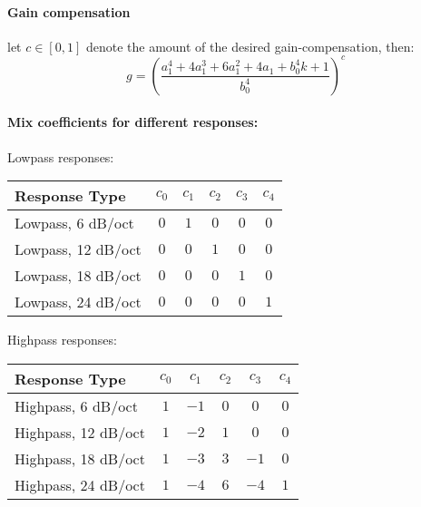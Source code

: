 \paragraph{Gain compensation} let $c \in [0, 1] $ denote the amount of the desired gain-compensation, then:
\begin{equation}
  g = \left( \frac{ a_1^4 + 4 a_1^3 + 6 a_1^2 + 4 a_1 + b_0^4 k + 1}{b_0^4} \right)^c
\end{equation}

\paragraph{Mix coefficients for different responses:} 

Lowpass responses:
\begin{center}
\begin{tabular}{|l|c|c|c|c|c|}
 \hline
 Response Type                        & $c_0$ & $c_1$ & $c_2$ & $c_3$ & $c_4$                            \\
 \hline 
 Lowpass, 6 dB/oct                    &  $0$  & $1$   & $0$   & $0$   & $0$                              \\    
 Lowpass, 12 dB/oct                   &  $0$  & $0$   & $1$   & $0$   & $0$                              \\  
 Lowpass, 18 dB/oct                   &  $0$  & $0$   & $0$   & $1$   & $0$                              \\   
 Lowpass, 24 dB/oct                   &  $0$  & $0$   & $0$   & $0$   & $1$                              \\   
 \hline
\end{tabular}
\end{center}

Highpass responses:
\begin{center}
\begin{tabular}{|l|c|c|c|c|c|}
 \hline
 Response Type                        & $c_0$ & $c_1$ & $c_2$ & $c_3$ & $c_4$                            \\
 \hline
 Highpass, 6 dB/oct                   &  $1$  & $-1$  & $0$   & $0$   & $0$                              \\  
 Highpass, 12 dB/oct                  &  $1$  & $-2$  & $1$   & $0$   & $0$                              \\   
 Highpass, 18 dB/oct                  &  $1$  & $-3$  & $3$   & $-1$  & $0$                              \\    
 Highpass, 24 dB/oct                  &  $1$  & $-4$  & $6$   & $-4$  & $1$                              \\    
 \hline
\end{tabular}
\end{center}

